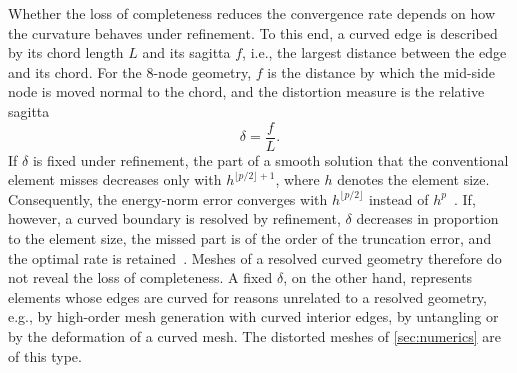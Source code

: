 Whether the loss of completeness reduces the convergence rate depends on how the curvature behaves under refinement. To this end, a curved edge is described by its chord length $L$ and its sagitta $f$, i.e., the largest distance between the edge and its chord. For the 8-node geometry, $f$ is the distance by which the mid-side node is moved normal to the chord, and the distortion measure is the relative sagitta
%
\begin{equation}
  \delta=\frac{f}{L} .
  \label{eq:delta}
\end{equation}
%
If $\delta$ is fixed under refinement, the part of a smooth solution that the conventional element misses decreases only with $h^{\lfloor p/2\rfloor+1}$, where $h$ denotes the element size. Consequently, the energy-norm error converges with $h^{\lfloor p/2\rfloor}$ instead of $h^p$~\cite{Eisentraeger2026axisymmetric}. If, however, a curved boundary is resolved by refinement, $\delta$ decreases in proportion to the element size, the missed part is of the order of the truncation error, and the optimal rate is retained~\cite{Ciarlet1972Interpolation,Lenoir1986optimal}. Meshes of a resolved curved geometry therefore do not reveal the loss of completeness. A fixed $\delta$, on the other hand, represents elements whose edges are curved for reasons unrelated to a resolved geometry, e.g., by high-order mesh generation with curved interior edges, by untangling or by the deformation of a curved mesh. The distorted meshes of \cref{sec:numerics} are of this type.
%
